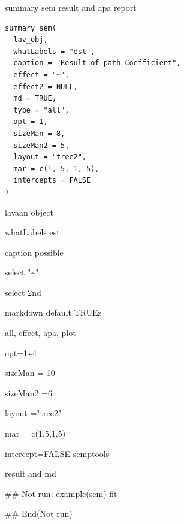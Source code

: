 \documentclass[a4paper]{book}
\begin{document}
%
\begin{Description}
summary sem result and apa report
\end{Description}
%
\begin{Usage}
\begin{verbatim}
summary_sem(
  lav_obj,
  whatLabels = "est",
  caption = "Result of path Coefficient",
  effect = "~",
  effect2 = NULL,
  md = TRUE,
  type = "all",
  opt = 1,
  sizeMan = 8,
  sizeMan2 = 5,
  layout = "tree2",
  mar = c(1, 5, 1, 5),
  intercepts = FALSE
)
\end{verbatim}
\end{Usage}
%
\begin{Arguments}
\begin{ldescription}
\item[\code{lav\_obj}] lavaan object

\item[\code{whatLabels}] whatLabels est

\item[\code{caption}] caption possible

\item[\code{effect}] select "\textasciitilde{}"

\item[\code{effect2}] select 2nd

\item[\code{md}] markdown default TRUEz

\item[\code{type}] all, effect, apa, plot

\item[\code{opt}] opt=1\textasciitilde{}4

\item[\code{sizeMan}] sizeMan = 10

\item[\code{sizeMan2}] sizeMan2 =6

\item[\code{layout}] layout ="tree2"

\item[\code{mar}] mar = c(1,5,1,5)

\item[\code{intercepts}] intercept=FALSE semptools
\end{ldescription}
\end{Arguments}
%
\begin{Value}
result and md
\end{Value}
%
\begin{Examples}
\begin{ExampleCode}

\#\# Not run: 
example(sem)
fit %


## End(Not run)
\end{ExampleCode}
\end{Examples}
\end{document}
